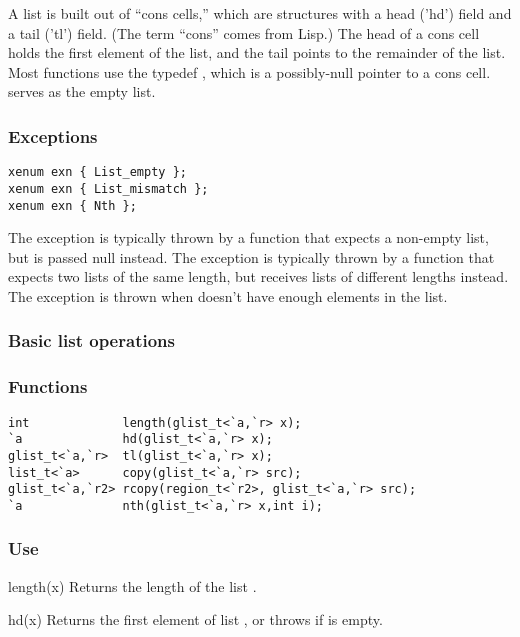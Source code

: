 A list is built out of ``cons cells,'' which are structures with a
head ('hd') field and a tail ('tl') field.  (The term ``cons'' comes
from Lisp.)  The head of a cons cell holds the first element of the
list, and the tail points to the remainder of the list.  Most
functions use the typedef , which is a possibly-null
pointer to a cons cell.   serves as the empty list.

\subsubsection*{Exceptions}
\begin{verbatim}
xenum exn { List_empty };
xenum exn { List_mismatch };
xenum exn { Nth };
\end{verbatim}

The  exception is typically thrown by a function that
expects a non-empty list, but is passed null instead.  The
 exception is typically thrown by a function that
expects two lists of the same length, but receives lists of different
lengths instead.  The  exception is thrown when
 doesn't have enough elements in the list.

\subsubsection*{Basic list operations}
\subsubsection*{Functions}
\begin{verbatim}
int             length(glist_t<`a,`r> x);
`a              hd(glist_t<`a,`r> x);
glist_t<`a,`r>  tl(glist_t<`a,`r> x);
list_t<`a>      copy(glist_t<`a,`r> src);
glist_t<`a,`r2> rcopy(region_t<`r2>, glist_t<`a,`r> src);
`a              nth(glist_t<`a,`r> x,int i);
\end{verbatim}

\subsubsection*{Use}

\begin{defun}{length}{(x)}
Returns the length of the list .
\end{defun}

\begin{defun}{hd}{(x)}
Returns the first element of list , or throws 
if  is empty.
\end{defun}

